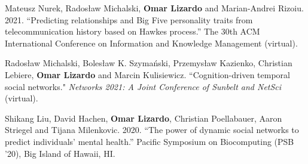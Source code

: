 \ind Mateusz Nurek, Rados\l{}aw Michalski, {\bf Omar Lizardo} and Marian-Andrei Rizoiu. 2021. ``Predicting relationships and Big Five personality traits from telecommunication history based on Hawkes process.'' The 30th ACM International Conference on Information and Knowledge Management (virtual).

\ind Rados\l{}aw Michalski, Boles\l{}aw K. Szyma\'{n}ski, Przemys\l{}aw Kazienko, Christian Lebiere, {\bf Omar Lizardo} and Marcin Kulisiewicz. ``Cognition-driven temporal social networks." {\em Networks 2021: A Joint Conference of Sunbelt and NetSci} (virtual).

\ind Shikang Liu, David Hachen, {\bf Omar Lizardo}, Christian Poellabauer, Aaron Striegel and Tijana Milenkovic. 2020. ``The power of dynamic social networks to predict individuals' mental health.'' Pacific Symposium on Biocomputing (PSB '20), Big Island of Hawaii, HI. 
  

